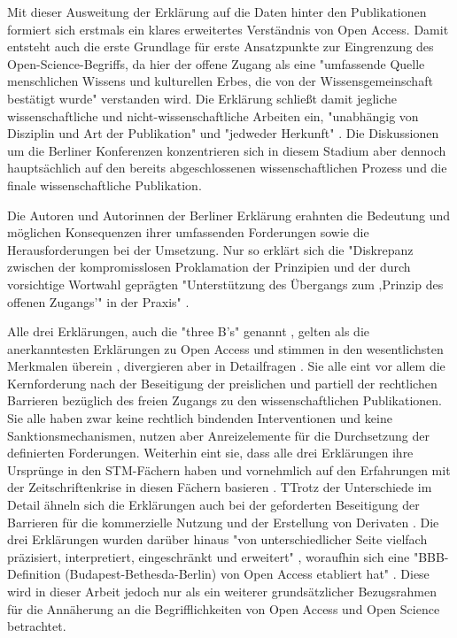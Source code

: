 \begin{enumerate}
Mit dieser Ausweitung der Erklärung auf die Daten hinter den Publikationen formiert sich erstmals ein klares erweitertes Verständnis von Open Access. Damit entsteht auch die erste Grundlage für erste Ansatzpunkte zur Eingrenzung des Open-Science-Begriffs, da hier der offene Zugang als eine "umfassende Quelle menschlichen Wissens und kulturellen Erbes, die von der Wissensgemeinschaft bestätigt wurde" \cite{Berliner_Erklaerung_2003} verstanden wird. Die Erklärung schließt damit jegliche wissenschaftliche und nicht-wissenschaftliche Arbeiten ein, "unabhängig von Disziplin und Art der Publikation" und "jedweder Herkunft" \cite{Naeder_2010}. Die Diskussionen um die Berliner Konferenzen konzentrieren sich in diesem Stadium aber dennoch hauptsächlich auf den bereits abgeschlossenen wissenschaftlichen Prozess und die finale wissenschaftliche Publikation.

Die Autoren und Autorinnen der Berliner Erklärung erahnten die Bedeutung und möglichen Konsequenzen ihrer umfassenden Forderungen sowie die Herausforderungen bei der Umsetzung. Nur so erklärt sich die "Diskrepanz zwischen der kompromisslosen Proklamation der Prinzipien und der durch vorsichtige Wortwahl geprägten "Unterstützung des Übergangs zum ‚Prinzip des offenen Zugangs’" in der Praxis" \cite{Lossau_2007}.
\end{enumerate}

Alle drei Erklärungen, auch die "three B's" genannt \cite{Suber_2004}, gelten als die anerkanntesten Erklärungen zu Open Access und stimmen in den wesentlichsten Merkmalen überein \cite{Albert_2006}, divergieren aber in Detailfragen \cite{Naeder_2010}. Sie alle eint vor allem die Kernforderung nach der Beseitigung der preislichen und partiell der rechtlichen Barrieren bezüglich des freien Zugangs zu den wissenschaftlichen Publikationen. Sie alle haben zwar keine rechtlich bindenden Interventionen und keine Sanktionsmechanismen, nutzen aber Anreizelemente für die Durchsetzung der definierten Forderungen. Weiterhin eint sie, dass alle drei Erklärungen ihre Ursprünge in den STM-Fächern haben und vornehmlich auf den Erfahrungen mit der Zeitschriftenkrise in diesen Fächern basieren \cite{Naeder_2010}. TTrotz der Unterschiede im Detail ähneln sich die Erklärungen auch bei der geforderten Beseitigung der Barrieren für die kommerzielle Nutzung und der Erstellung von Derivaten \cite{CREATe_2014}. Die drei Erklärungen wurden darüber hinaus "von unterschiedlicher Seite vielfach präzisiert, interpretiert, eingeschränkt und erweitert" \cite{Naeder_2010}, woraufhin sich eine "BBB-
Definition (Budapest-Bethesda-Berlin) von Open Access etabliert hat" \cite{Schirmbacher_2007}. Diese wird in dieser Arbeit jedoch nur als ein weiterer grundsätzlicher Bezugsrahmen für die Annäherung an die Begrifflichkeiten von Open Access und Open Science betrachtet.

